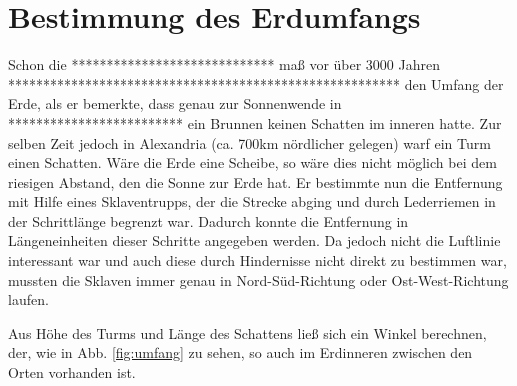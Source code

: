 \documentclass[12pt,a4paper,titlepage,headinclude,bibtotoc]{scrartcl}
\begin{document}
\section{Bestimmung des Erdumfangs}
Schon die *****************************  maß vor über 3000 Jahren ********************************************************
den Umfang der Erde, als er bemerkte, dass genau zur Sonnenwende in *************************
ein Brunnen keinen Schatten im inneren hatte.
Zur selben Zeit jedoch in Alexandria (ca. 700km nördlicher gelegen) warf ein Turm einen Schatten.
Wäre die Erde eine Scheibe, so wäre dies nicht möglich bei dem riesigen Abstand, den die Sonne zur Erde hat.
Er bestimmte nun die Entfernung mit Hilfe eines Sklaventrupps, der die Strecke abging und durch Lederriemen in der Schrittlänge begrenzt war.
Dadurch konnte die Entfernung in Längeneinheiten dieser Schritte angegeben werden.
Da jedoch nicht die Luftlinie interessant war und auch diese durch Hindernisse nicht direkt zu bestimmen war, mussten die Sklaven immer genau in Nord-Süd-Richtung oder Ost-West-Richtung laufen.

Aus Höhe des Turms und Länge des Schattens ließ sich ein Winkel berechnen, der, wie in Abb. \ref{fig:umfang} zu sehen, so auch im Erdinneren zwischen den Orten vorhanden ist.












\end{document}
